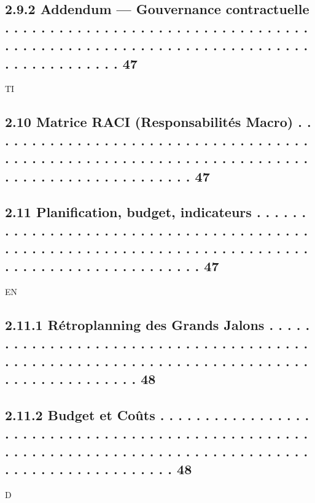 \subsection{2.9.2               Addendum — Gouvernance contractuelle . . . . . . . . . . . . . . . . . . . . . . . . . . . . . . . . . . . . . . . . . . . . . . . . . . . . . . . . . . . . . . . . . . . . . . . . . . . . . . . . . 47}
\vspace{0.5em}
\vspace{0.5em}
\vspace{0.5em}
\vspace{0.5em}
TI\\
\subsection{2.10    Matrice RACI (Responsabilités Macro) . . . . . . . . . . . . . . . . . . . . . . . . . . . . . . . . . . . . . . . . . . . . . . . . . . . . . . . . . . . . . . . . . . . . . . . . . . . . . . . . . . . . . . . . . . . 47}
\subsection{2.11    Planification, budget, indicateurs . . . . . . . . . . . . . . . . . . . . . . . . . . . . . . . . . . . . . . . . . . . . . . . . . . . . . . . . . . . . . . . . . . . . . . . . . . . . . . . . . . . . . . . . . . . . . . . . 47}
\vspace{0.5em}
\vspace{0.5em}
\vspace{0.5em}
\vspace{0.5em}
EN\\
\subsection{2.11.1              Rétroplanning des Grands Jalons . . . . . . . . . . . . . . . . . . . . . . . . . . . . . . . . . . . . . . . . . . . . . . . . . . . . . . . . . . . . . . . . . . . . . . . . . . . . . . . . . . . . . . . . 48}
\subsection{2.11.2              Budget et Coûts . . . . . . . . . . . . . . . . . . . . . . . . . . . . . . . . . . . . . . . . . . . . . . . . . . . . . . . . . . . . . . . . . . . . . . . . . . . . . . . . . . . . . . . . . . . . . . . . . . . . . . . . 48}
\vspace{0.5em}
\vspace{0.5em}
\vspace{0.5em}
\vspace{0.5em}
D\\
